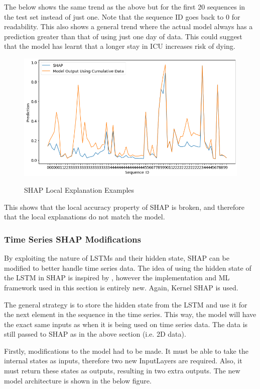 \documentclass[12pt]{article}
\begin{document}
The below shows the same trend as the above but for the first 20 sequences in the test set instead of just one. Note that the sequence ID goes back to 0 for readability. This also shows a general trend where the actual model always has a prediction greater than that of using just one day of data. This could suggest that the model has learnt that a longer stay in ICU increases risk of dying.

\begin{figure}[H]
\centering\caption{SHAP Local Explanation Examples}
\includegraphics[scale=0.4]{Vanilla SHAP local2.png}
\label{SHAP Local Explanation Examples}
\end{figure}

This shows that the local accuracy property of SHAP is broken, and therefore that the local explanations do not match the model.

\subsubsection{Time Series SHAP Modifications}

By exploiting the nature of LSTMs and their hidden state, SHAP can be modified to better handle time series data. The idea of using the hidden state of the LSTM in SHAP is inspired by \cite{TimeSeriesSHAP}, however the implementation and ML framework used in this section is entirely new. Again, Kernel SHAP is used.

The general strategy is to store the hidden state from the LSTM and use it for the next element in the sequence in the time series. This way, the model will have the exact same inputs as when it is being used on time series data. The data is still passed to SHAP as in the above section (i.e. 2D data).

Firstly, modifications to the model had to be made. It must be able to take the internal states as inputs, therefore two new InputLayers are required. Also, it must return these states as outputs, resulting in two extra outputs. The new model architecture is shown in the below figure.
\end{document}
